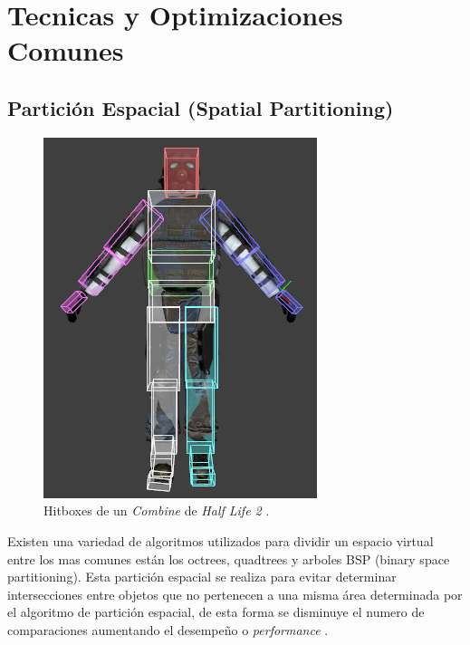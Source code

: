 \section{Tecnicas y Optimizaciones Comunes}
\subsection{Partición Espacial (Spatial Partitioning)}
\setlength\intextsep{0pt}
\begin{figure}
\includegraphics[width=\linewidth]{semana5/Hitbox.jpg}
\caption{Hitboxes de un \emph{Combine} de \emph{Half Life 2} \cite{valve_hit} \cite{halflife2}.}
\label{fig:hitboxes}
\end{figure}
Existen una variedad de algoritmos utilizados para dividir un espacio virtual entre los mas comunes están los octrees, quadtrees y arboles BSP (binary space partitioning). Esta partición espacial se realiza para evitar determinar intersecciones entre objetos que no pertenecen a una misma área determinada por el algoritmo de partición espacial, de esta forma se disminuye el numero de comparaciones aumentando el desempeño o \emph{performance} \cite{sp_partition}.
